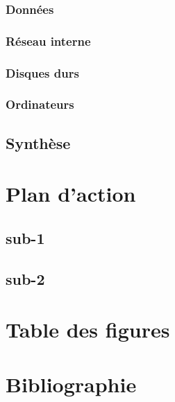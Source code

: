 \documentclass[12pt]{article}
\begin{document}
\subsubsection{Données}

\subsubsection{Réseau interne}

\subsubsection{Disques durs}

\subsubsection{Ordinateurs}

\subsection{Synthèse}

\section{Plan d'action}

\subsection{sub-1}

\subsection{sub-2}

\newpage


\section*{Table des figures}
\makeatletter
{}%
\makeatother
{}%


\nocite{*}
\section*{Bibliographie}
\printbibliography[heading=none]
%

\end{document}
